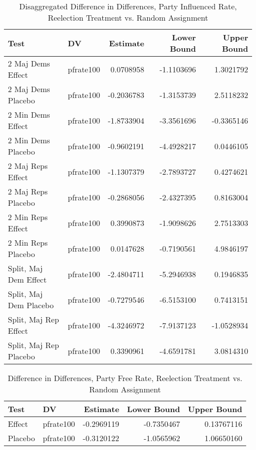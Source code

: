 \documentclass[12pt]{article}
\begin{document}
\begin{table}[H]
	\centering
	\caption{Disaggregated Difference in Differences, Party Influenced Rate, Reelection Treatment vs. Random Assignment}
	\begin{tabular}{llrrr}
		\hline
		Test & DV & Estimate & Lower Bound & Upper Bound \\ 
		\hline
		2 Maj Dems Effect & pfrate100 & 0.0708958 & -1.1103696 & 1.3021792 \\ 
		2 Maj Dems Placebo & pfrate100 & -0.2036783 & -1.3153739 & 2.5118232 \\ 
		\hline
		2 Min Dems Effect & pfrate100 & -1.8733904 & -3.3561696 & -0.3365146 \\ 
		2 Min Dems Placebo & pfrate100 & -0.9602191 & -4.4928217 & 0.0446105 \\ 
		\hline
		2 Maj Reps Effect & pfrate100 & -1.1307379 & -2.7893727 & 0.4274621 \\ 
		2 Maj Reps Placebo & pfrate100 & -0.2868056 & -2.4327395 & 0.8163004 \\
		\hline 
		2 Min Reps Effect & pfrate100 & 0.3990873 & -1.9098626 & 2.7513303 \\ 
		2 Min Reps Placebo & pfrate100 & 0.0147628 & -0.7190561 & 4.9846197 \\ 
		\hline
		Split, Maj Dem Effect & pfrate100 & -2.4804711 & -5.2946938 & 0.1946835 \\ 
		Split, Maj Dem Placebo & pfrate100 & -0.7279546 & -6.5153100 & 0.7413151 \\
		\hline 
		Split, Maj Rep Effect & pfrate100 & -4.3246972 & -7.9137123 & -1.0528934 \\ 
		Split, Maj Rep Placebo & pfrate100 & 0.3390961 & -4.6591781 & 3.0814310 \\
		\hline
	\end{tabular}
\end{table}

\pagebreak

\begin{table}[H]
	\centering
	\caption{Difference in Differences, Party Free Rate, Reelection Treatment vs. Random Assignment}
	\begin{tabular}{llrrr}
		\hline
		Test & DV & Estimate & Lower Bound & Upper Bound \\ 
		\hline
		Effect & pfrate100 & -0.2969119 & -0.7350467 & 0.13767116 \\ 
		Placebo & pfrate100 & -0.3120122 & -1.0565962 & 1.06650160 \\  
		\hline
	\end{tabular}
\end{table}
\end{document}
